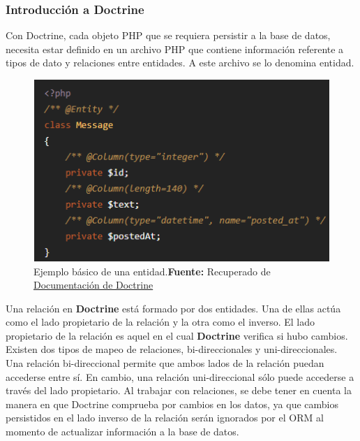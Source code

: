 \documentclass{article}
\begin{document}
\subsubsection{Introducción a Doctrine}%
\label{ssub:introducción_doctrine}
Con Doctrine, cada objeto PHP que se requiera persistir a la base de datos, necesita estar definido en un archivo PHP que
contiene información referente a tipos de dato y relaciones entre entidades. A este archivo se lo denomina entidad.

\begin{figure}[h]
    \includegraphics[width=1\linewidth]{image/entidad-doctrine.png}
    \caption{Ejemplo básico de una entidad.\newline \textbf{Fuente:} Recuperado de \href{https://www.doctrine-project.org/
    projects/doctrine-orm/en/2.6/reference/basic-mapping.html}{Documentación de Doctrine}}%
    \label{fig:image/entidad-doctrine}
\end{figure}
Una relación en \textbf{Doctrine} está formado por dos entidades. Una de ellas actúa como el lado propietario de la relación y la otra como el inverso\@.
El lado propietario de la relación es aquel en el cual \textbf{Doctrine} verifica si hubo cambios.
Existen dos tipos de mapeo de relaciones, bi-direccionales y uni-direccionales\@.
Una relación bi-direccional permite que ambos lados de la relación puedan accederse entre sí\@. En cambio, una relación uni-direccional sólo puede accederse
a través del lado propietario\@.
Al trabajar con relaciones, se debe tener en cuenta la manera en que Doctrine comprueba por cambios en los datos, ya que cambios persistidos en el lado
inverso de la relación serán ignorados por el ORM al momento de actualizar información a la base de datos.
\end{document}
